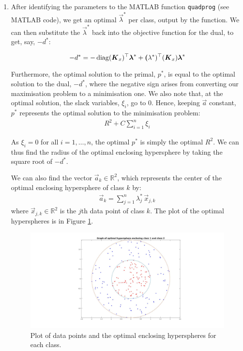 \documentclass[12pt,twoside]{article}
\begin{document}
\begin{enumerate}[1.)]
\item

After identifying the parameters to the MATLAB function \texttt{quadprog} (see MATLAB code), we get an optimal $\vec \lambda^*$ per class, output by the function. We can then substitute the $\vec \lambda^*$ back into the objective function for the dual, to get, say, $-d^*$:

\begin{align*}
-d^* = -\operatorname*{diag} ({\boldsymbol{{K}}}_x)^\top {\boldsymbol{{\lambda}}}^* + {\boldsymbol{{(}}}\lambda^*) ^\top ({\boldsymbol{{K}}}_x) {\boldsymbol{{\lambda}}}^*
\end{align*}

Furthermore, the optimal solution to the primal, $p^*$, is equal to the optimal solution to the dual, $-d^*$, where the negative sign arises from converting our maximisation problem to a minimisation one. We also note that, at the optimal solution, the slack variables, $\xi_i$, go to 0. Hence, keeping $\vec a$ constant, $p^*$ represents the optimal solution to the minimisation problem:
\begin{align*}
R^2 + C \sum_{i=1}^n \xi_i
\end{align*}

As $\xi_i=0$ for all $i = 1, \dots , n$, the optimal $p^*$ is simply the optimal $R^2$. We can thus find the radius of the optimal enclosing hypersphere by taking the square root of $-d^*$. 

We can also find the vector $\vec a_k \in \mathbb{R}^2$, which represents the center of the optimal enclosing hypersphere of class $k$ by:
\begin{align*}
\vec a_k = \sum_{j=1}^n \lambda_j^* \, \vec x_{j,k}
\end{align*}
where $\vec x_{j, k} \in \mathbb{R}^2$ is the $j$th data point of class $k$. The plot of the optimal hyperspheres is in Figure \ref{fig:part2Spheres}.

\begin{figure}
  \centering
    \includegraphics[scale = 0.28]{./figures/sphere.jpg}
  \caption{Plot of data points and the optimal enclosing hyperspheres for each class.}
  \label{fig:part2Spheres}
\end{figure}

\end{enumerate}
\end{document}
